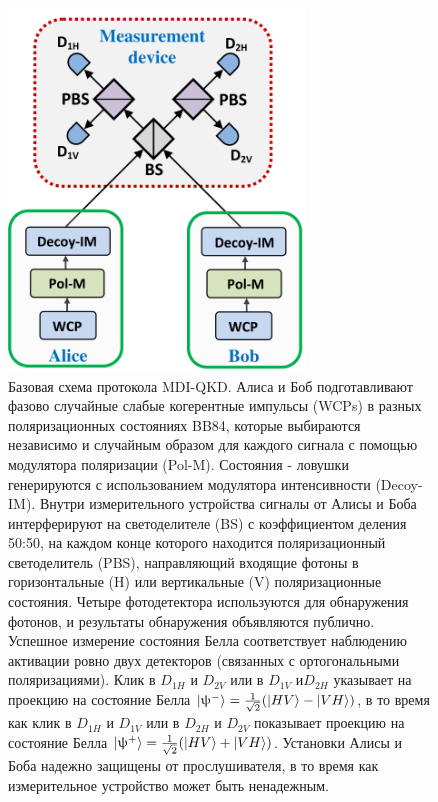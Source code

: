 \begin{figure}
    \centering
    \includegraphics[width=0.7\textwidth]{images/MDi scheme.png}
    \caption{Базовая схема протокола MDI-QKD.
Алиса и Боб подготавливают фазово случайные слабые когерентные импульсы (WCPs) в разных поляризационных состояниях BB84, которые выбираются независимо и случайным образом для каждого сигнала с помощью модулятора поляризации (Pol-M). Состояния - ловушки генерируются с использованием модулятора интенсивности (Decoy-IM). Внутри измерительного устройства сигналы от Алисы и Боба интерферируют на светоделителе  (BS) с коэффициентом деления 50:50, на каждом конце которого находится поляризационный светоделитель (PBS), направляющий входящие фотоны в горизонтальные (H) или вертикальные (V) поляризационные состояния. Четыре фотодетектора используются для обнаружения фотонов, и результаты обнаружения объявляются публично. Успешное измерение состояния Белла соответствует наблюдению активации ровно двух детекторов (связанных с ортогональными поляризациями). Клик в $D_{1H}$ и $D_{2V}$ или в $D_{1V}$ и$D_{2H}$ указывает на проекцию на состояние Белла $\lvert\uppsi^{-}\rangle = \frac{1}{\sqrt{2}}(\lvert HV\rangle - \lvert VH\rangle)$, в то время как клик в $D_{1H}$ и $D_{1V}$ или в $D_{2H}$ и $D_{2V}$ показывает проекцию на состояние Белла $\lvert\uppsi^{+}\rangle = \frac{1}{\sqrt{2}}(\lvert HV\rangle + \lvert VH\rangle)$. Установки Алисы и Боба надежно защищены от прослушивателя, в то время как измерительное устройство может быть ненадежным.
}
\end{figure} \label{fig:MDI scheme lit}
